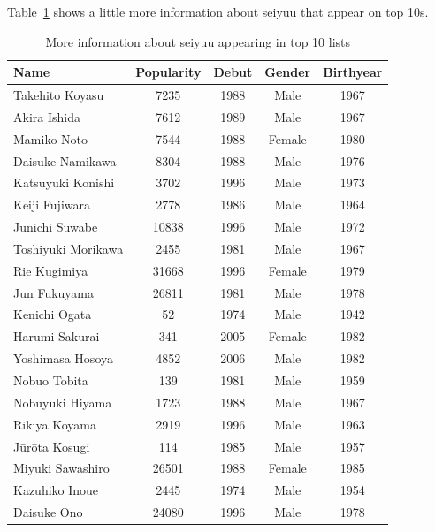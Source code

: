 Table~\ref{tab:moreInfoSeiyuu} shows a little more information about seiyuu that appear on top 10s.
\begin{table}[!hbt]
	\begin{center}
	\caption{More information about seiyuu appearing in top 10 lists}
	\label{tab:moreInfoSeiyuu}
	\begin{tabular}{|l|c|c|c|c|}
		\hline
		Name & Popularity & Debut & Gender & Birthyear \\
		\hline
		Takehito Koyasu & 7235 & 1988 & Male & 1967 \\
		\hline
		Akira Ishida & 7612 & 1989 & Male & 1967 \\
		\hline
		Mamiko Noto & 7544 & 1988 & Female & 1980 \\
		\hline
		Daisuke Namikawa & 8304 & 1988 & Male & 1976 \\
		\hline
		Katsuyuki Konishi & 3702 & 1996 & Male & 1973 \\
		\hline
		Keiji Fujiwara & 2778 & 1986 & Male & 1964 \\
		\hline
		Junichi Suwabe & 10838 & 1996 & Male & 1972 \\
		\hline
		Toshiyuki Morikawa & 2455 & 1981 & Male & 1967 \\
		\hline
		Rie Kugimiya & 31668 & 1996 & Female & 1979 \\
		\hline
		Jun Fukuyama & 26811 & 1981 & Male & 1978 \\
		\hline
		Kenichi Ogata & 52 & 1974 & Male & 1942 \\
		\hline
		Harumi Sakurai & 341 & 2005 & Female & 1982 \\
		\hline
		Yoshimasa Hosoya & 4852 & 2006 & Male & 1982 \\
		\hline
		Nobuo Tobita & 139 & 1981 & Male & 1959 \\
		\hline
		Nobuyuki Hiyama & 1723 & 1988 & Male & 1967 \\
		\hline
		Rikiya Koyama & 2919 & 1996 & Male & 1963 \\
		\hline
		Jūrōta Kosugi & 114 & 1985 & Male & 1957 \\
		\hline
		Miyuki Sawashiro & 26501 & 1988 & Female & 1985 \\
		\hline
		Kazuhiko Inoue & 2445 & 1974 & Male & 1954 \\
		\hline
		Daisuke Ono & 24080 & 1996 & Male & 1978 \\
		\hline
	\end{tabular}
	\end{center}
\end{table}
